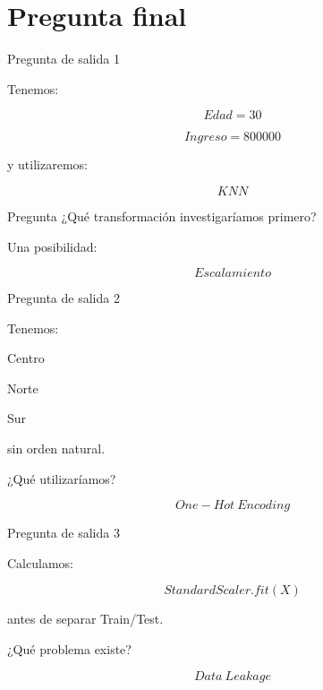 \documentclass[aspectratio=169,11pt]{beamer}
\begin{document}
\section{Pregunta final}

\begin{frame}{Pregunta de salida 1}

Tenemos:

\[
Edad=30
\]

\[
Ingreso=800000
\]

y utilizaremos:

\[
KNN
\]

\vspace{0.5cm}

\begin{alertblock}{Pregunta}
¿Qué transformación investigaríamos primero?
\end{alertblock}

Una posibilidad:

\[
\boxed{
Escalamiento
}
\]

\end{frame}


\begin{frame}{Pregunta de salida 2}

Tenemos:

\begin{center}

Centro

Norte

Sur
\end{center}

sin orden natural.

\vspace{0.4cm}

¿Qué utilizaríamos?

\[
\boxed{
One-Hot\ Encoding
}
\]

\end{frame}


\begin{frame}{Pregunta de salida 3}

Calculamos:

\[
StandardScaler.fit(X)
\]

antes de separar Train/Test.

¿Qué problema existe?

\[
\boxed{
Data\ Leakage
}
\]

\end{frame}
\end{document}
